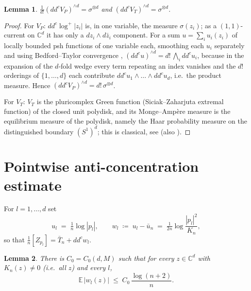 \documentclass[12pt]{article}
\def\C{\mathbb{C}}
\def\E{\mathbb{E}}
\def\ddc{dd^c}
\newtheorem{lemma}{Lemma}[section]
\begin{document}
\begin{lemma}\label{lem:limitMA}
$\frac{1}{d!} (\ddc V_P)^{\wedge d} = \sigma^{\otimes d}$ and
$(\ddc V_T)^{\wedge d} = \sigma^{\otimes d}$.
\end{lemma}

\begin{proof}
For $V_P$: $\ddc \log^+|z_i|$ is, in one variable, the measure $\sigma(z_i)$; as a
$(1,1)$-current on $\C^d$ it has only a $dz_i \wedge d\bar z_i$ component. For a sum
$u = \sum_i u_i(z_i)$ of locally bounded psh functions of one variable each, smoothing
each $u_i$ separately and using Bedford--Taylor convergence \cite{BT82},
$(\ddc u)^{\wedge d} = d!\, \bigwedge_i \ddc u_i$, because in the expansion of the
$d$-fold wedge every term repeating an index vanishes and the $d!$ orderings of
$\{1,\dots,d\}$ each contribute $\ddc u_1 \wedge \dots \wedge \ddc u_d$, i.e.\ the
product measure. Hence $(\ddc V_P)^{\wedge d} = d!\, \sigma^{\otimes d}$.

For $V_T$: $V_T$ is the pluricomplex Green function (Siciak--Zaharjuta extremal
function) of the closed unit polydisk, and its Monge--Amp\`ere measure is the
equilibrium measure of the polydisk, namely the Haar probability measure on the
distinguished boundary $(S^1)^d$; this is classical, see \cite[\S5.1]{Kli} (also
\cite{BT82}).
\end{proof}

\section{Pointwise anti-concentration estimate}

For $l = 1,\dots,d$ set
\[
  u_l \;=\; \tfrac1n \log |p_l|, \qquad
  w_l \;\coloneqq\; u_l - \bar u_n \;=\; \tfrac{1}{2n} \log \frac{|p_l|^2}{K_n},
\]
so that $\frac1n [Z_{p_l}] = \bar T_n + \ddc w_l$.

\begin{lemma}\label{lem:pointwise}
There is $C_0 = C_0(d,M)$ such that for every $z \in \C^d$ with $K_n(z) \neq 0$ (i.e.\
all $z$) and every $l$,
\[
  \E\,|w_l(z)| \;\le\; C_0\, \frac{\log (n+2)}{n}.
\]
\end{lemma}
\end{document}
